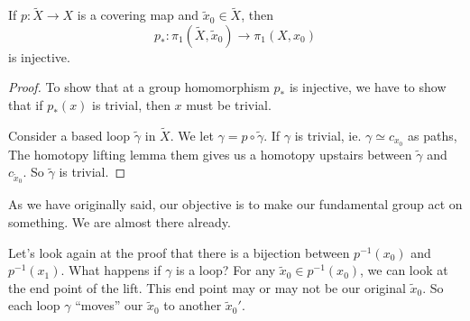 \documentclass[a4paper]{article}
\begin{document}
\begin{lemma}
  If $p: \tilde{X} \to X$ is a covering map and $\tilde{x}_0 \in \tilde{X}$, then
  \[
    p_*: \pi_1(\tilde{X}, \tilde{x}_0) \to \pi_1(X, x_0)
  \]
  is injective.
\end{lemma}

\begin{proof}
  To show that at a group homomorphism $p_*$ is injective, we have to show that if $p_*(x)$ is trivial, then $x$ must be trivial.

  Consider a based loop $\tilde{\gamma}$ in $\tilde{X}$. We let $\gamma = p\circ \tilde{\gamma}$. If $\gamma$ is trivial, ie. $\gamma \simeq c_{x_0}$ as paths, The homotopy lifting lemma them gives us a homotopy upstairs between $\tilde{\gamma}$ and $c_{\tilde{x}_0}$. So $\tilde{\gamma}$ is trivial.
\end{proof}

As we have originally said, our objective is to make our fundamental group act on something. We are almost there already.

Let's look again at the proof that there is a bijection between $p^{-1}(x_0)$ and $p^{-1}(x_1)$. What happens if $\gamma$ is a loop? For any $\tilde{x}_0 \in p^{-1}(x_0)$, we can look at the end point of the lift. This end point may or may not be our original $\tilde{x}_0$. So each loop $\gamma$ ``moves'' our $\tilde{x}_0$ to another $\tilde{x}_0'$.
\end{document}
